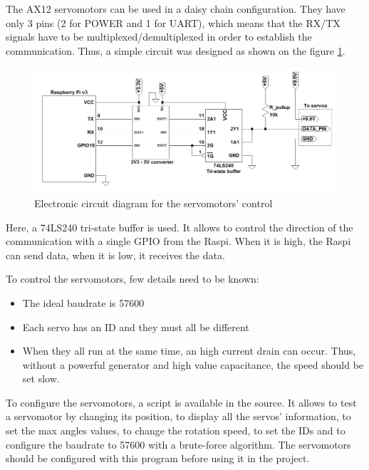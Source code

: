 \documentclass{article}
\newcommand{\vsp}{\vspace{\baselineskip}}
\begin{document}
\vsp

The AX12 servomotors can be used in a daisy chain configuration. They have only 3 pins (2 for POWER and 1 for UART), which means that the RX/TX signals have to be multiplexed/demultiplexed in order to establish the communication. Thus, a simple circuit was designed as shown on the figure \ref{fig:elec_sch_servos}. 

\begin{figure}[H]
    \centering
    \includegraphics[width = \textwidth]{images/elec_sch_servo.png}
    \caption{Electronic circuit diagram for the servomotors' control}
    \label{fig:elec_sch_servos}
\end{figure}


Here, a 74LS240 tri-state buffer is used. It allows to control the direction of the communication with a single GPIO from the Raspi. When it is high, the Raspi can send data, when it is low, it receives the data. 

\vsp

To control the servomotors, few details need to be known:
\begin{itemize}
    \item The ideal baudrate is 57600
    \item Each servo has an ID and they must all be different
    \item When they all run at the same time, an high current drain can occur. Thus, without a powerful generator and high value capacitance, the speed should be set slow.
\end{itemize}

To configure the servomotors, a script is available in the source. It allows to test a servomotor by changing its position, to display all the servos' information, to set the max angles values, to change the rotation speed, to set the IDs and to configure the baudrate to 57600 with a brute-force algorithm. The servomotors should be configured with this program before using it in the project.
\end{document}
